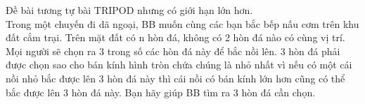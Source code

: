 Đề bài tương tự bài TRIPOD nhưng có giới hạn lớn hơn.   
\\   Trong một chuyến đi dã ngoại, BB muốn cùng các bạn bắc bếp nấu cơm trên khu đất cắm trại. Trên mặt đất có n hòn đá, không có 2 hòn đá nào có cùng vị trí. Mọi người sẽ chọn ra 3 trong số các hòn đá này để bắc nồi lên. 3 hòn đá phải được chọn sao cho bán kính hình tròn chứa chúng là nhỏ nhất vì nếu có một cái nồi nhỏ bắc được lên 3 hòn đá này thì cái nồi có bán kính lớn hơn cũng có thể bắc được lên 3 hòn đá này. Bạn hãy giúp BB tìm ra 3 hòn đá cần chọn.  

\